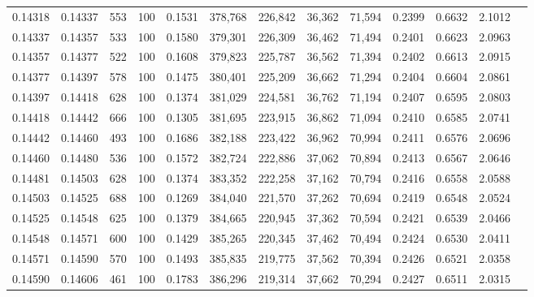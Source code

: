 \begin{tabular}{rrrrrrrrrrrrr}
0.14318 & 0.14337 &   553 & 100 &                                     0.1531 & 378,768 & 226,842 &  36,362 &  71,594 & 0.2399 & 0.6632 & 2.1012 \\
0.14337 & 0.14357 &   533 & 100 &                                     0.1580 & 379,301 & 226,309 &  36,462 &  71,494 & 0.2401 & 0.6623 & 2.0963 \\
0.14357 & 0.14377 &   522 & 100 &                                     0.1608 & 379,823 & 225,787 &  36,562 &  71,394 & 0.2402 & 0.6613 & 2.0915 \\
0.14377 & 0.14397 &   578 & 100 &                                     0.1475 & 380,401 & 225,209 &  36,662 &  71,294 & 0.2404 & 0.6604 & 2.0861 \\
0.14397 & 0.14418 &   628 & 100 &                                     0.1374 & 381,029 & 224,581 &  36,762 &  71,194 & 0.2407 & 0.6595 & 2.0803 \\
0.14418 & 0.14442 &   666 & 100 &                                     0.1305 & 381,695 & 223,915 &  36,862 &  71,094 & 0.2410 & 0.6585 & 2.0741 \\
0.14442 & 0.14460 &   493 & 100 &                                     0.1686 & 382,188 & 223,422 &  36,962 &  70,994 & 0.2411 & 0.6576 & 2.0696 \\
0.14460 & 0.14480 &   536 & 100 &                                     0.1572 & 382,724 & 222,886 &  37,062 &  70,894 & 0.2413 & 0.6567 & 2.0646 \\
0.14481 & 0.14503 &   628 & 100 &                                     0.1374 & 383,352 & 222,258 &  37,162 &  70,794 & 0.2416 & 0.6558 & 2.0588 \\
0.14503 & 0.14525 &   688 & 100 &                                     0.1269 & 384,040 & 221,570 &  37,262 &  70,694 & 0.2419 & 0.6548 & 2.0524 \\
0.14525 & 0.14548 &   625 & 100 &                                     0.1379 & 384,665 & 220,945 &  37,362 &  70,594 & 0.2421 & 0.6539 & 2.0466 \\
0.14548 & 0.14571 &   600 & 100 &                                     0.1429 & 385,265 & 220,345 &  37,462 &  70,494 & 0.2424 & 0.6530 & 2.0411 \\
0.14571 & 0.14590 &   570 & 100 &                                     0.1493 & 385,835 & 219,775 &  37,562 &  70,394 & 0.2426 & 0.6521 & 2.0358 \\
0.14590 & 0.14606 &   461 & 100 &                                     0.1783 & 386,296 & 219,314 &  37,662 &  70,294 & 0.2427 & 0.6511 & 2.0315 \\

\end{tabular}
